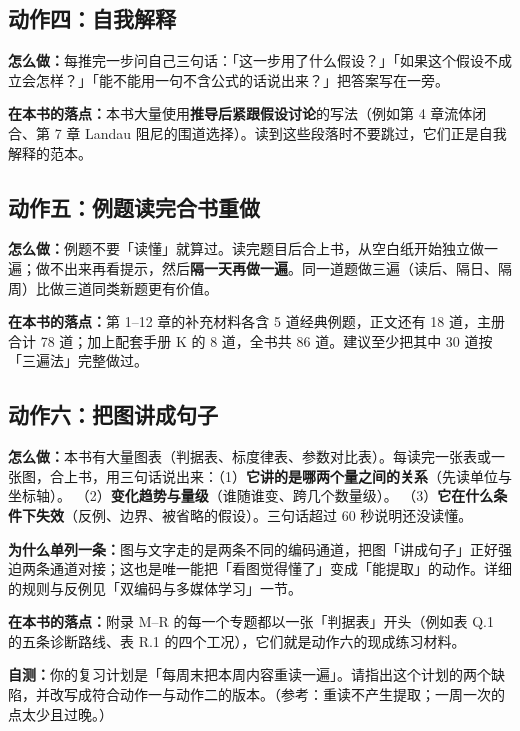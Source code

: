 \subsection{动作四：自我解释}

\textbf{怎么做：}每推完一步问自己三句话：「这一步用了什么假设？」「如果这个假设不成立会怎样？」「能不能用一句不含公式的话说出来？」把答案写在一旁。

\textbf{在本书的落点：}本书大量使用\textbf{推导后紧跟假设讨论}的写法（例如第 4 章流体闭合、第 7 章 Landau 阻尼的围道选择）。读到这些段落时不要跳过，它们正是自我解释的范本。

\subsection{动作五：例题读完合书重做}

\textbf{怎么做：}例题不要「读懂」就算过。读完题目后合上书，从空白纸开始独立做一遍；做不出来再看提示，然后\textbf{隔一天再做一遍}。同一道题做三遍（读后、隔日、隔周）比做三道同类新题更有价值。

\textbf{在本书的落点：}第 1--12 章的补充材料各含 5 道经典例题，正文还有 18 道，主册合计 78 道；加上配套手册 K 的 8 道，全书共 86 道。建议至少把其中 30 道按「三遍法」完整做过。

\subsection{动作六：把图讲成句子}

\textbf{怎么做：}本书有大量图表（判据表、标度律表、参数对比表）。每读完一张表或一张图，合上书，用三句话说出来：（1）\textbf{它讲的是哪两个量之间的关系}（先读单位与坐标轴）。
（2）\textbf{变化趋势与量级}（谁随谁变、跨几个数量级）。
（3）\textbf{它在什么条件下失效}（反例、边界、被省略的假设）。三句话超过 60 秒说明还没读懂。

\textbf{为什么单列一条：}图与文字走的是两条不同的编码通道，把图「讲成句子」正好强迫两条通道对接；这也是唯一能把「看图觉得懂了」变成「能提取」的动作。详细的规则与反例见「双编码与多媒体学习」一节。

\textbf{在本书的落点：}附录 M--R 的每一个专题都以一张「判据表」开头（例如表 Q.1 的五条诊断路线、表 R.1 的四个工况），它们就是动作六的现成练习材料。

\begin{miniquiz}
\textbf{自测：}你的复习计划是「每周末把本周内容重读一遍」。请指出这个计划的两个缺陷，并改写成符合动作一与动作二的版本。（参考：重读不产生提取；一周一次的点太少且过晚。）
\end{miniquiz}


